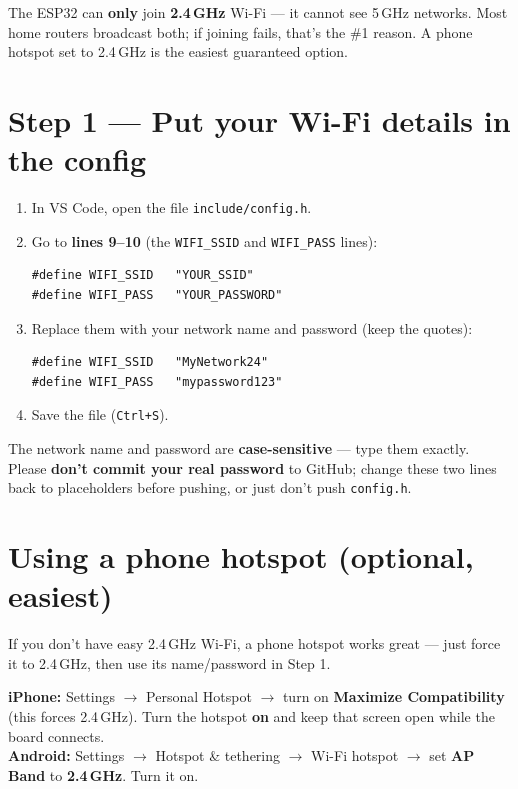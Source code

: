 \documentclass[11pt]{article}
\begin{document}
\begin{warn}
The ESP32 can \textbf{only} join \textbf{2.4\,GHz} Wi-Fi --- it cannot see 5\,GHz
networks. Most home routers broadcast both; if joining fails, that's the \#1 reason.
A phone hotspot set to 2.4\,GHz is the easiest guaranteed option.
\end{warn}

\section{Step 1 --- Put your Wi-Fi details in the config}
\begin{enumerate}
  \item In VS Code, open the file \texttt{include/config.h}.
  \item Go to \textbf{lines 9--10} (the \texttt{WIFI\_SSID} and \texttt{WIFI\_PASS}
        lines):
\begin{lstlisting}
#define WIFI_SSID   "YOUR_SSID"
#define WIFI_PASS   "YOUR_PASSWORD"
\end{lstlisting}
  \item Replace them with your network name and password (keep the quotes):
\begin{lstlisting}
#define WIFI_SSID   "MyNetwork24"
#define WIFI_PASS   "mypassword123"
\end{lstlisting}
  \item Save the file (\texttt{Ctrl+S}).
\end{enumerate}

\begin{warn}
The network name and password are \textbf{case-sensitive} --- type them exactly.
Please \textbf{don't commit your real password} to GitHub; change these two lines
back to placeholders before pushing, or just don't push \texttt{config.h}.
\end{warn}

\section{Using a phone hotspot (optional, easiest)}
If you don't have easy 2.4\,GHz Wi-Fi, a phone hotspot works great --- just force it
to 2.4\,GHz, then use its name/password in Step 1.

\begin{phone}
\textbf{iPhone:} Settings \(\rightarrow\) Personal Hotspot \(\rightarrow\) turn on
\textbf{Maximize Compatibility} (this forces 2.4\,GHz). Turn the hotspot \textbf{on}
and keep that screen open while the board connects.\\[4pt]
\textbf{Android:} Settings \(\rightarrow\) Hotspot \& tethering \(\rightarrow\) Wi-Fi
hotspot \(\rightarrow\) set \textbf{AP Band} to \textbf{2.4\,GHz}. Turn it on.
\end{phone}
\end{document}
